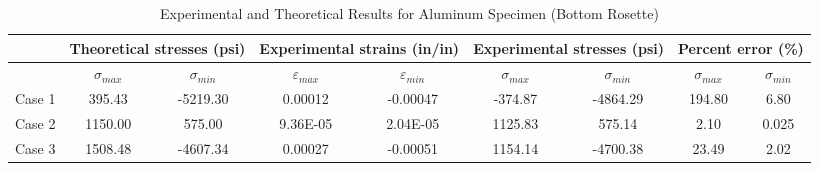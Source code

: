 \documentclass[12pt, titlepage]{article}
\begin{document}
\begin{table}[H]
  \begin{adjustwidth}{-1in}{-1in}
    \begin{tabular}{|c|c|c|c|c|c|c|c|c|} \hline
        & \multicolumn{2}{|c|}{\parbox{4cm}{\centering\textbf{Theoretical stresses (psi)}}} 
        & \multicolumn{2}{|c|}{\parbox{4cm}{\centering\textbf{Experimental strains (in/in)}}} 
        & \multicolumn{2}{|c|}{\parbox{4cm}{\centering\textbf{Experimental stresses (psi)}}} 
        & \multicolumn{2}{|c|}{\parbox{4cm}{\centering\textbf{Percent error (\%)}}} 
        \\ \hline
        & $\sigma_{max}$ & $\sigma_{min}$ & $\varepsilon_{max}$ & $\varepsilon_{min}$ & $\sigma_{max}$ & $\sigma_{min}$ & $\sigma_{max}$ & $\sigma_{min}$ \\ \hline
        Case 1 & 395.43 & -5219.30 & 0.00012 & -0.00047 & -374.87 & -4864.29 & 194.80 & 6.80 \\ \hline
        Case 2 & 1150.00 & 575.00 & 9.36E-05 & 2.04E-05 & 1125.83 & 575.14 & 2.10 & 0.025 \\ \hline
        Case 3 & 1508.48 & -4607.34 & 0.00027 & -0.00051 & 1154.14 & -4700.38 & 23.49 & 2.02 \\ \hline
    \end{tabular}
  \end{adjustwidth}
  \captionsetup{justification=raggedright,singlelinecheck=false}
  \caption{Experimental and Theoretical Results for Aluminum Specimen (Bottom Rosette)}
  \label{tab:table_alu_bot}
\end{table}
\newpage
\end{document}
